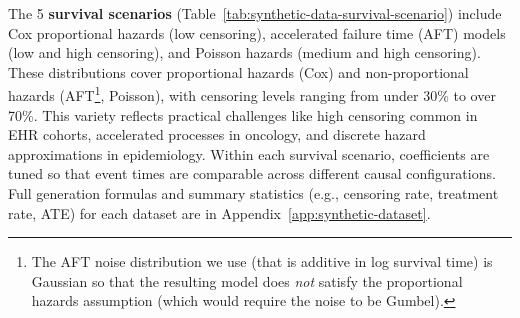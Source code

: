 \documentclass{article} %
\begin{document}
\vspace{-3pt}
The 5 \textbf{survival scenarios} (Table~\ref{tab:synthetic-data-survival-scenario})
include Cox proportional hazards (low censoring), accelerated failure time (AFT) models (low and high censoring), and Poisson hazards (medium and high censoring). These distributions cover proportional hazards (Cox) and non-proportional hazards (AFT\footnote{The AFT noise distribution we use (that is additive in log survival time) is Gaussian so that the resulting model does \emph{not} satisfy the proportional hazards assumption (which would require the noise to be Gumbel).}, Poisson), with censoring levels ranging from under 30\% to over 70\%.
This variety reflects practical challenges like high censoring common in EHR cohorts, accelerated processes in oncology, and discrete hazard approximations in epidemiology. Within each survival scenario, coefficients are tuned so that event times are comparable across different causal configurations.
Full generation formulas and summary statistics (e.g., censoring rate, treatment rate, ATE) for each dataset are in Appendix~\ref{app:synthetic-dataset}.
\end{document}
